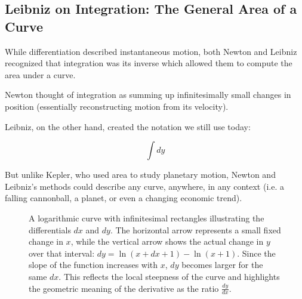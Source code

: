 \subsection{Leibniz on Integration: The General Area of a Curve}  

While differentiation described instantaneous motion, both Newton and Leibniz recognized that integration was its inverse which allowed them to compute the area under a curve.  

Newton thought of integration as summing up infinitesimally small changes in position (essentially reconstructing motion from its velocity).  

Leibniz, on the other hand, created the notation we still use today:

\[
\int dy
\]

But unlike Kepler, who used area to study planetary motion, Newton and Leibniz’s methods could describe any curve, anywhere, in any context (i.e. a falling cannonball, a planet, or even a changing economic trend).  

\begin{figure}[H]
\centering
{}

\vspace{0.5em}
\caption{\small A logarithmic curve with infinitesimal rectangles illustrating the differentials $dx$ and $dy$. The horizontal arrow represents a small fixed change in $x$, while the vertical arrow shows the actual change in $y$ over that interval: $dy = \ln(x+dx+1) - \ln(x+1)$. Since the slope of the function increases with $x$, $dy$ becomes larger for the same $dx$. This reflects the local steepness of the curve and highlights the geometric meaning of the derivative as the ratio $\frac{dy}{dx}$.}
\end{figure}



